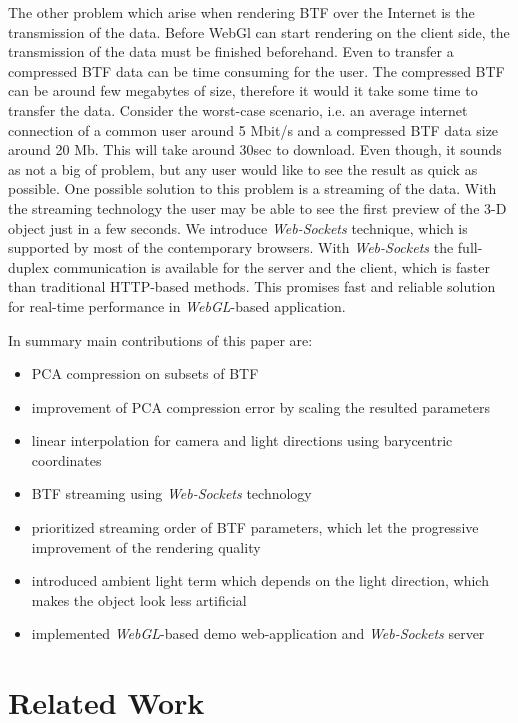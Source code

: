 The other problem which arise when rendering BTF over the Internet is the transmission of the data.
Before WebGl can start rendering on the client side, the transmission of the data must be finished beforehand.
Even to transfer a compressed BTF data can be time consuming for the user. 
The compressed BTF can be around few megabytes of size, therefore it would it take some time to transfer the data.
Consider the worst-case scenario, i.e. an average internet connection of a common user around 5 Mbit/s and a compressed BTF data size around 20 Mb.
This will take around 30sec to download. Even though, it sounds as not a big of problem, but any user would like to see the result as quick as possible.
One possible solution to this problem is a streaming of the data. 
With the streaming technology the user may be able to see the first preview of the 3-D object just in a few seconds.
We introduce  \emph{Web-Sockets} technique, which is supported by most of the contemporary browsers.
With \emph{Web-Sockets}  the  full-duplex communication is available for the server and the client, which is faster than traditional HTTP-based methods. 
This promises fast and reliable solution for real-time performance in \emph{WebGL}-based application.

In summary main contributions of this paper are:

\begin{itemize}
 \item PCA compression on subsets of BTF
 \item improvement of PCA compression error by scaling the resulted parameters
 \item linear interpolation for camera and light directions using barycentric coordinates
 \item BTF streaming using \emph{Web-Sockets} technology
 \item prioritized streaming order of BTF parameters, which let the progressive improvement of the rendering quality
 \item introduced ambient light term which depends on the light direction, which makes the object look less artificial
 \item implemented \emph{WebGL}-based demo web-application and \emph{Web-Sockets} server
\end{itemize}


\section{Related Work}
\label{section:related_work}


